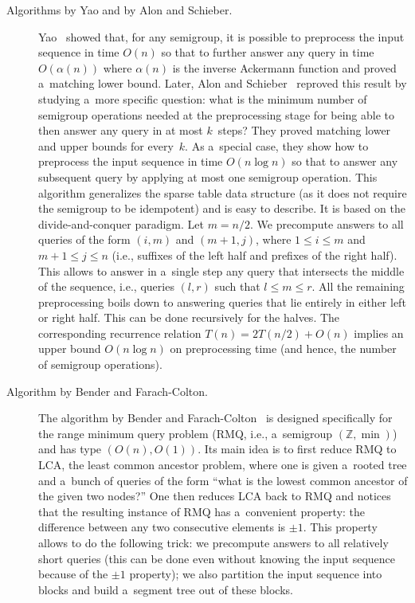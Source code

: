 \documentclass[11pt,letterpaper]{article}
\begin{document}
\begin{description}
\item[Algorithms by Yao and by Alon and Schieber.] Yao~\cite{DBLP:conf/stoc/Yao82} showed that, for any semigroup, it is possible to preprocess the input sequence in time $O(n)$ so that to further answer any query in time $O(\alpha(n))$ where $\alpha(n)$ is the inverse Ackermann function and proved a~matching lower bound. Later, Alon and Schieber~\cite{Alon87optimalpreprocessing} reproved this result by studying a~more specific question: what is the minimum number of semigroup operations needed at the preprocessing stage for being able to then answer any query in at most $k$~steps? They proved matching lower and upper bounds for every~$k$. As a~special case, they show how to preprocess the input sequence in time $O(n\log n)$ so that to answer any subsequent query by applying at most one semigroup operation. This algorithm generalizes the sparse table data structure (as it does not require the semigroup to be idempotent) and is easy to describe. It is based on the divide-and-conquer paradigm. Let $m=n/2$. We precompute answers to all queries of the form $(i,m)$ and $(m+1,j)$, where $1 \le i \le m$ and $m+1 \le j \le n$ (i.e., suffixes of the left half and prefixes of the right half). This allows to answer in a~single step any query that intersects the middle of the sequence, i.e., queries $(l,r)$ such that $l \le m \le r$. All the remaining preprocessing boils down to answering queries that lie entirely in either left or right half. This can be done recursively for the halves. The corresponding recurrence relation $T(n)=2T(n/2)+O(n)$ implies an upper bound $O(n\log n)$ on preprocessing time (and hence, the number of semigroup operations).



\item[Algorithm by Bender and Farach-Colton.] The algorithm by Bender and Farach-Colton~\cite{DBLP:conf/latin/BenderF00} is designed specifically for the range minimum query problem (RMQ, i.e., a~semigroup $(\mathbb{Z}, \min)$) and has type $(O(n), O(1))$. Its main idea is to first reduce RMQ to LCA, the least common ancestor problem, where one is given a~rooted tree and a~bunch of queries of the form ``what is the lowest common ancestor of the given two nodes?'' One then reduces LCA back to RMQ and notices that the resulting instance of RMQ has a~convenient property: the difference between any two consecutive elements is $\pm 1$. This property allows to do the following trick: we precompute answers to all relatively short queries (this can be done even without knowing the input sequence because of the $\pm 1$ property); we also partition the input sequence into blocks and build a~segment tree out of these blocks.
\end{description}
\end{document}
